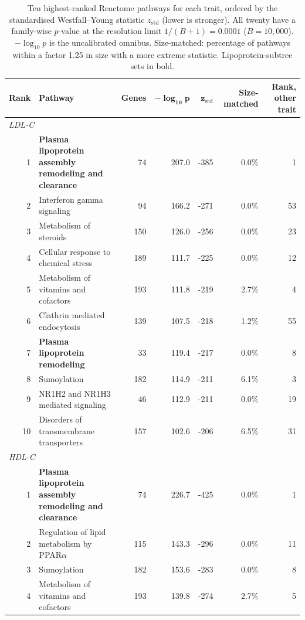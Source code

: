\begin{table}[!htbp]
\centering
\caption{Ten highest-ranked Reactome pathways for each trait, ordered by the standardised Westfall--Young statistic $z_{\mathrm{std}}$ (lower is stronger). All twenty have a family-wise $p$-value at the resolution limit $1/(B+1)=0.0001$ ($B=10{,}000$). $-\log_{10}p$ is the uncalibrated omnibus. Size-matched: percentage of pathways within a factor 1.25 in size with a more extreme statistic. Lipoprotein-subtree sets in bold.}
\label{tab:lipid_pathways}
\small
\begin{tabular*}{\linewidth}{@{\extracolsep{\fill}}rlrrrrr}
\hline
\textbf{Rank} & \textbf{Pathway} & \textbf{Genes} & $\boldsymbol{-\log_{10}p}$ & $\boldsymbol{z_{\mathrm{std}}}$ & \textbf{Size-matched} & \textbf{Rank, other trait} \\
\hline
\multicolumn{7}{l}{\textit{LDL-C}} \\
1 & \textbf{Plasma lipoprotein assembly remodeling and clearance} & 74 & 207.0 & -385 & 0.0\% & 1 \\
2 & Interferon gamma signaling & 94 & 166.2 & -271 & 0.0\% & 53 \\
3 & Metabolism of steroids & 150 & 126.0 & -256 & 0.0\% & 23 \\
4 & Cellular response to chemical stress & 189 & 111.7 & -225 & 0.0\% & 12 \\
5 & Metabolism of vitamins and cofactors & 193 & 111.8 & -219 & 2.7\% & 4 \\
6 & Clathrin mediated endocytosis & 139 & 107.5 & -218 & 1.2\% & 55 \\
7 & \textbf{Plasma lipoprotein remodeling} & 33 & 119.4 & -217 & 0.0\% & 8 \\
8 & Sumoylation & 182 & 114.9 & -211 & 6.1\% & 3 \\
9 & NR1H2 and NR1H3 mediated signaling & 46 & 112.9 & -211 & 0.0\% & 19 \\
10 & Disorders of transmembrane transporters & 157 & 102.6 & -206 & 6.5\% & 31 \\
\multicolumn{7}{l}{\textit{HDL-C}} \\
1 & \textbf{Plasma lipoprotein assembly remodeling and clearance} & 74 & 226.7 & -425 & 0.0\% & 1 \\
2 & Regulation of lipid metabolism by PPAR$\alpha$ & 115 & 143.3 & -296 & 0.0\% & 11 \\
3 & Sumoylation & 182 & 153.6 & -283 & 0.0\% & 8 \\
4 & Metabolism of vitamins and cofactors & 193 & 139.8 & -274 & 2.7\% & 5 \\

\end{tabular*}
\end{table}
